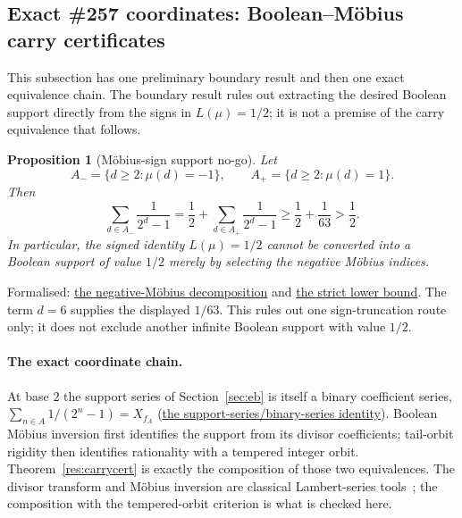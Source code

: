 \documentclass[11pt]{article}
\newcommand{\commit}{ebc98ee71f6819bd9fe344a0bb343542c604e533}
\newcommand{\repobase}{https://github.com/wcook04/plectis-lean-erdos249-257/blob/\commit}
\newcommand{\PK}{Erdos249257}
\newcommand{\lword}[4]{\href{\repobase/\PK/#1\#L#2}{#4}}
\newtheorem{proposition}[theorem]{Proposition}
\theoremstyle{definition}
\theoremstyle{remark}
\begin{document}
\subsection{Exact \#257 coordinates: Boolean--M\"obius carry certificates}
\label{app:carry-boolean}

This subsection has one preliminary boundary result and then one exact
equivalence chain.  The boundary result rules out extracting the desired
Boolean support directly from the signs in \(L(\mu)=1/2\); it is not a premise
of the carry equivalence that follows.

\begin{proposition}[M\"obius-sign support no-go]\label{res:mobiussignnogo}
Let
\[
 A_-=\{d\ge2:\mu(d)=-1\},
 \qquad A_+=\{d\ge2:\mu(d)=1\}.
\]
Then
\[
 \sum_{d\in A_-}\frac1{2^d-1}
 =\frac12+\sum_{d\in A_+}\frac1{2^d-1}
 \ge\frac12+\frac1{63}>\frac12.
\]
In particular, the signed identity \(L(\mu)=1/2\) cannot be converted into a
Boolean support of value \(1/2\) merely by selecting the negative M\"obius
indices.
\end{proposition}
\noindent Formalised:
\lword{MobiusSignSupportNoGo.lean}{111}{tsum_negativeMobius_eq_half_add_positiveMobiusTail}{the negative-M\"obius decomposition}
and
\lword{MobiusSignSupportNoGo.lean}{150}{half_add_one_div_sixty_three_le_tsum_negativeMobius}{the strict lower bound}.
The term \(d=6\) supplies the displayed \(1/63\).  This rules out one
sign-truncation route only; it does not exclude another infinite Boolean
support with value \(1/2\).

\paragraph{The exact coordinate chain.}
At base $2$ the support series of Section~\ref{sec:eb} is itself a binary
coefficient series, $\sum_{n\in A}1/(2^n-1)=X_{f_A}$
(\lword{BooleanMobiusCarry.lean}{376}{erdosSupportSeries_two_eq_binaryCoeffSeries}{the support-series/binary-series identity}).
Boolean M\"obius inversion first identifies the support from its divisor
coefficients; tail-orbit rigidity then identifies rationality with a tempered
integer orbit.  Theorem~\ref{res:carrycert} is exactly the composition of
those two equivalences.  The divisor transform and M\"obius inversion are
classical Lambert-series tools~\cite{apostol,merca2017,mercaschmidt}; the
composition with the tempered-orbit criterion is what is checked here.
\end{document}
